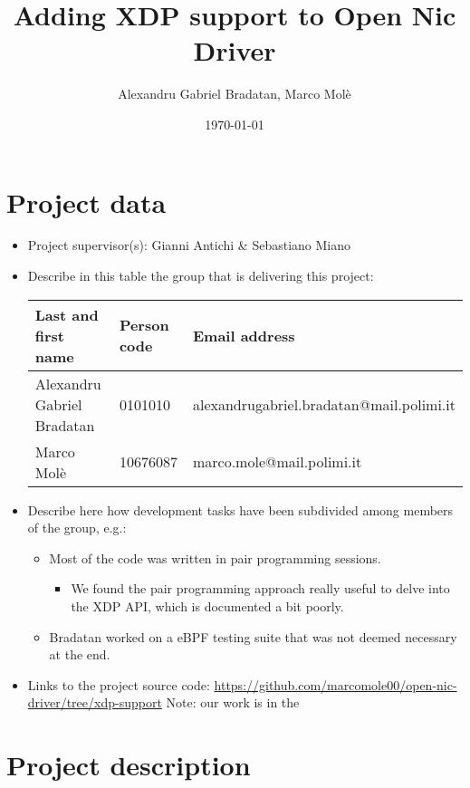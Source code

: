 \documentclass[10pt,a4]{article}
\author{Alexandru Gabriel Bradatan, Marco Molè}
\date{\today}
\title{Adding XDP support to Open Nic Driver}
\begin{document}
\maketitle
\tableofcontents



\section{Project data}

\begin{itemize}
\item  Project supervisor(s): Gianni Antichi \& Sebastiano Miano 

\item 
Describe in this table the group that is delivering this project:

\begin{center}
\begin{tabular}{lll}
Last and first name & Person code & Email address\\
\hline
  Alexandru Gabriel Bradatan & 0101010 & alexandrugabriel.bradatan@mail.polimi.it \\
  Marco Molè & 10676087  &     marco.mole@mail.polimi.it        
\end{tabular}
\end{center}

\item
Describe here how development tasks have been subdivided among members
of the group, e.g.:

\begin{itemize}
\item Most of the code was written in pair programming sessions.
\begin{itemize}
	\item We found the pair programming approach really useful to delve into the XDP API, which is documented a bit poorly. 
\end{itemize}
\item Bradatan worked on a eBPF testing suite that was not deemed necessary at the end.
\end{itemize}

\item Links to the project source code:  \url{https://github.com/marcomole00/open-nic-driver/tree/xdp-support}
Note: our work is in the 

\end{itemize}


\section{Project description}
\end{document}
